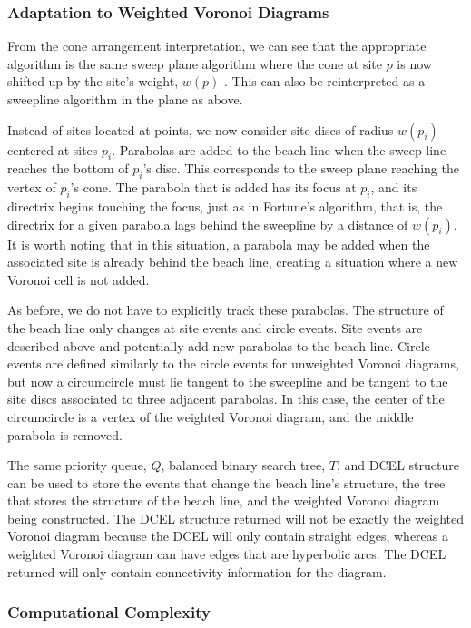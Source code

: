 \documentclass[a4paper, 11pt]{article}
\begin{document}
\subsubsection{Adaptation to Weighted Voronoi Diagrams}
From the cone arrangement interpretation, we can see that the appropriate algorithm is the same sweep plane algorithm where the cone at site $p$ is
now shifted up by the site's weight, $w(p)$ \cite{rosenberger_additive}. This can also be reinterpreted as a sweepline algorithm in the plane as
above.

Instead of sites located at points, we now consider site discs of radius $w(p_i)$ centered at sites $p_i$. Parabolas are added to the beach
line when the sweep line reaches the bottom of $p_i$'s disc. This corresponds to the sweep plane reaching the vertex of $p_i$'s cone. The
parabola that is added has its focus at $p_i$, and its directrix begins touching the focus, just as in Fortune's algorithm, that is, the
directrix for a given parabola lags behind the sweepline by a distance of $w(p_i)$. It is worth noting that in this situation, a parabola may be added
when the associated site is already behind the beach line, creating a situation where a new Voronoi cell is not added.

As before, we do not have to explicitly track these parabolas. The structure of the beach line only changes at site events and circle events. Site
events are described above and potentially add new parabolas to the beach line. Circle events are defined similarly to the circle events for
unweighted Voronoi diagrams, but now a circumcircle must lie tangent to the sweepline and be tangent to the site discs associated to three adjacent
parabolas. In this case, the center of the circumcircle is a vertex of the weighted Voronoi diagram, and the middle parabola is removed.

The same priority queue, $Q$, balanced binary search tree, $T$, and DCEL structure can be used to store the events that change the beach line's
structure, the tree that stores the structure of the beach line, and the weighted Voronoi diagram being constructed. The DCEL structure returned will
not be exactly the weighted Voronoi diagram because the DCEL will only contain straight edges, whereas a weighted Voronoi diagram can have edges that
are hyperbolic arcs. The DCEL returned will only contain connectivity information for the diagram.
\subsubsection{Computational Complexity}
\end{document}
